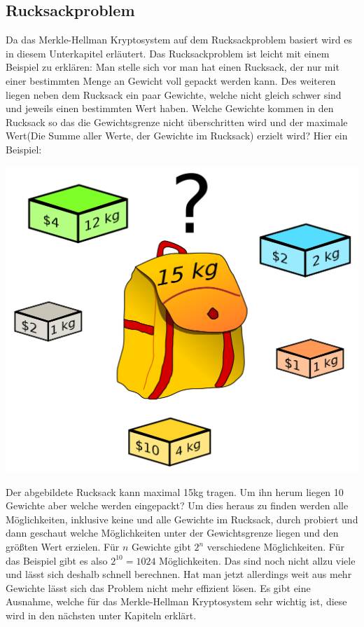 \documentclass[a4paper,12pt,titlepage]{article}
\begin{document}
\subsection{Rucksackproblem}\label{rucksack}
Da das Merkle-Hellman Kryptosystem auf dem Rucksackproblem basiert wird es in diesem Unterkapitel erläutert. \newline Das Rucksackproblem ist leicht mit einem Beispiel zu erklären: Man stelle sich vor man hat einen Rucksack, der nur mit einer bestimmten Menge an Gewicht voll gepackt werden kann. Des weiteren liegen neben dem Rucksack ein paar Gewichte, welche nicht gleich schwer sind und jeweils einen bestimmten Wert haben. Welche Gewichte kommen in den Rucksack so das die Gewichtsgrenze nicht überschritten wird und der maximale Wert(Die Summe aller Werte, der Gewichte im Rucksack) erzielt wird? \newline
Hier ein Beispiel:
\begin{center}
\includegraphics[scale=0.2]{rucksackproblem.png} %
\end{center}
Der abgebildete Rucksack kann maximal 15kg tragen. Um ihn herum liegen 10 Gewichte aber welche werden eingepackt? Um dies heraus zu finden werden alle Möglichkeiten, inklusive keine und alle Gewichte im Rucksack, durch probiert und dann geschaut welche Möglichkeiten unter der Gewichtsgrenze liegen und den größten Wert erzielen. Für $n$ Gewichte gibt $2^{n}$ verschiedene Möglichkeiten. Für das Beispiel gibt es also $2^{10} = 1024$ Möglichkeiten. Das sind noch nicht allzu viele und lässt sich deshalb schnell berechnen. Hat man jetzt allerdings weit aus mehr Gewichte lässt sich das Problem nicht mehr effizient lösen. Es gibt eine Ausnahme, welche für das Merkle-Hellman Kryptosystem sehr wichtig ist, diese wird in den nächsten unter Kapiteln erklärt.
\end{document}
